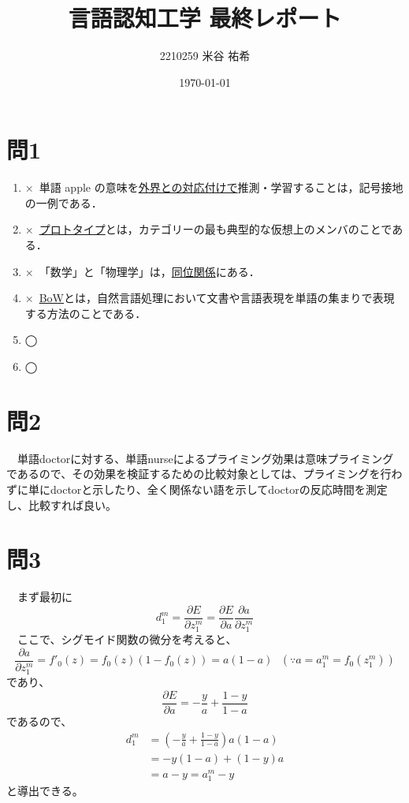\documentclass[a4j]{jarticle} %
\title{言語認知工学 最終レポート}
\author{2210259 米谷 祐希}
\date{\today} %
\begin{document}
\maketitle

\section*{問1} %
\renewcommand{\labelenumi}{(\arabic{enumi})}
\begin{enumerate}
\item ×~単語 apple の意味を\underline{外界との対応付けで}推測・学習することは，記号接地の一例である．
\item ×~\underline{プロトタイプ}とは，カテゴリーの最も典型的な仮想上のメンバのことである．
\item ×~「数学」と「物理学」は，\underline{同位関係}にある．
\item ×~\underline{BoW}とは，自然言語処理において文書や言語表現を単語の集まりで表現する方法のことである．
\item ◯
\item ◯
\end{enumerate}

\section*{問2}
　単語doctorに対する、単語nurseによるプライミング効果は意味プライミングであるので、その効果を検証するための比較対象としては、プライミングを行わずに単にdoctorと示したり、全く関係ない語を示してdoctorの反応時間を測定し、比較すれば良い。

\section*{問3}
　まず最初に
\begin{equation}
  d_1^m = \frac{\partial E}{\partial z_1^m} = \frac{\partial E}{\partial a}\frac{\partial a}{\partial z_1^m}
\end{equation}
　ここで、シグモイド関数の微分を考えると、
\begin{equation}
  \frac{\partial a}{\partial z_1^m} = f'_0(z) = f_0(z)(1-f_0(z)) = a(1-a)~~~ (\because a = a_1^m = f_0(z_1^m))
\end{equation}
であり、
\begin{equation}
  \frac{\partial E}{\partial a} = -\frac{y}{a} + \frac{1-y}{1-a}
\end{equation}
であるので、
\begin{align*}
  d_1^m &= (-\frac{y}{a} + \frac{1-y}{1-a})a(1-a) \\
  &= -y(1-a)+(1-y)a \\
  &= a-y = a_1^m - y
\end{align*}
と導出できる。
\end{document}
